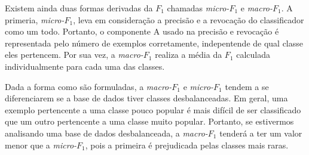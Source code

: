 Existem ainda duas formas derivadas da $F_1$ chamadas \textit{micro-$F_1$} e \textit{macro-$F_1$}. A primeria, \textit{micro-$F_1$}, leva em consideração a precisão e a revocação do classificador como um todo. 
Portanto, o componente A usado na precisão e revocação é representada pelo número de exemplos corretamente, indepentende de qual classe eles pertencem.
Por sua vez, a \textit{macro-$F_1$} realiza a média da $F_1$ calculada individualmente para cada uma das classes. 

Dada a forma como são formuladas, a \textit{macro-$F_1$} e \textit{micro-$F_1$} tendem a se diferenciarem se a base de dados tiver classes desbalanceadas. Em geral, uma exemplo pertencente a uma classe pouco popular é mais difícil de ser classificado que um outro pertencente a uma classe muito popular. Portanto, se estivermos analisando uma base de dados desbalanceada, a \textit{macro-$F_1$} tenderá a ter um valor menor que a \textit{micro-$F_1$}, pois a primeira é prejudicada pelas classes mais raras. 


